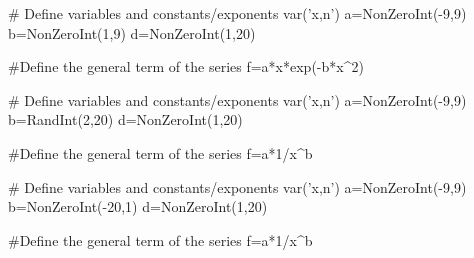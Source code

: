 \begin{sagesilent}
# Define variables and constants/exponents
var('x,n')
a=NonZeroInt(-9,9)
b=NonZeroInt(1,9)
d=NonZeroInt(1,20)

#Define the general term of the series
f=a*x*exp(-b*x^2)

\end{sagesilent}



\begin{sagesilent}
# Define variables and constants/exponents
var('x,n')
a=NonZeroInt(-9,9)
b=RandInt(2,20)
d=NonZeroInt(1,20)

#Define the general term of the series
f=a*1/x^b

\end{sagesilent}


\begin{sagesilent}
# Define variables and constants/exponents
var('x,n')
a=NonZeroInt(-9,9)
b=NonZeroInt(-20,1)
d=NonZeroInt(1,20)

#Define the general term of the series
f=a*1/x^b

\end{sagesilent}

